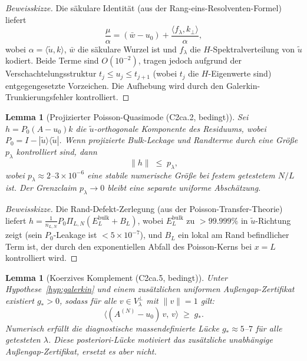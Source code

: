\documentclass[11pt,a4paper]{article}
\theoremstyle{plain}
\newtheorem{lemma}[theorem]{Lemma}
\theoremstyle{definition}
\begin{document}
\begin{proof}[Beweisskizze]
Die säkulare Identität (aus der Rang-eins-Resolventen-Formel) liefert
\[
  \frac{\mu}{\alpha} = (\bar{w} - u_0)
    + \frac{\langle f_\lambda, k_\perp\rangle}{\alpha},
\]
wobei $\alpha = \langle\tilde{u},k\rangle$, $\bar{w}$ die säkulare
Wurzel ist und $f_\lambda$ die $H$-Spektralverteilung von
$\tilde{u}$ kodiert. Beide Terme sind $O(10^{-2})$, tragen jedoch
aufgrund der Verschachtelungsstruktur $t_j \leq u_j \leq t_{j+1}$
(wobei $t_j$ die $H$-Eigenwerte sind) entgegengesetzte Vorzeichen. Die
Aufhebung wird durch den Galerkin-Trunkierungsfehler kontrolliert.
\end{proof}

\begin{lemma}[Projizierter Poisson-Quasimode (C2ca.2, bedingt)]
\label{lem:projected}
Sei $h = P_0(A-u_0)k$ die $\tilde{u}$-orthogonale Komponente
des Residuums, wobei $P_0 = I - |\tilde{u}\rangle\langle\tilde{u}|$.
Wenn projizierte Bulk-Leckage und Randterme durch eine Größe
$p_\lambda$ kontrolliert sind, dann
\[
  \|h\| \;\leq\; p_\lambda,
\]
wobei $p_\lambda \approx 2$--$3 \times 10^{-6}$ eine
stabile numerische Größe bei festem getestetem $N/L$ ist. Der
Grenzclaim $p_\lambda\to0$ bleibt eine separate uniforme Abschätzung.
\end{lemma}

\begin{proof}[Beweisskizze]
Die Rand-Defekt-Zerlegung (aus der Poisson-Transfer-Theorie)
liefert $h = \frac{1}{n_{L,N}} P_0 \Pi_{L,N}(E_L^{\mathrm{bulk}} + B_L)$,
wobei $E_L^{\mathrm{bulk}}$ zu $> 99.999\%$ in $\tilde{u}$-Richtung zeigt
(sein $P_0$-Leakage ist $< 5 \times 10^{-7}$), und $B_L$ ein lokal am Rand
befindlicher Term ist, der durch den exponentiellen Abfall des
Poisson-Kerns bei $x = L$ kontrolliert wird.
\end{proof}

\begin{lemma}[Koerzives Komplement (C2ca.5, bedingt)]
\label{lem:coercive}
Unter Hypothese~\ref{hyp:galerkin} und einem zusätzlichen uniformen
Außengap-Zertifikat existiert $g_* > 0$, sodass für alle
$v \in V_\lambda^\perp$ mit $\|v\| = 1$ gilt:
\[
  \langle (A^{(N)} - u_0)\, v,\, v\rangle \;\geq\; g_*.
\]
Numerisch erfüllt die diagnostische massendefinierte Lücke
$g_* \approx 5$--$7$ für alle getesteten $\lambda$. Diese posteriori-Lücke
motiviert das zusätzliche unabhängige Außengap-Zertifikat, ersetzt es aber nicht.
\end{lemma}
\end{document}
